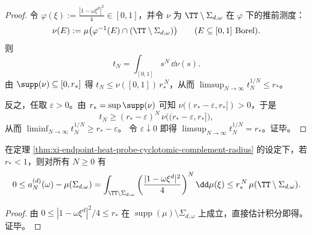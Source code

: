 \begin{proof}
令
\(
\varphi(\xi):=\frac{|1-\omega\xi^{d}|^2}{4}\in[0,1]
\)，并令 \(\nu\) 为 \(\TT\setminus\Sigma_{d,\omega}\) 在 \(\varphi\) 下的推前测度：
\[
\nu(E):=\mu\bigl(\varphi^{-1}(E)\cap(\TT\setminus\Sigma_{d,\omega})\bigr)\qquad(E\subseteq[0,1]\ \text{Borel}).
\]
则
\[
t_N=\int_{[0,1]} s^{N}\,\dd\nu(s).
\]
由 \(\supp(\nu)\subseteq[0,r_\ast]\) 得 \(t_N\le \nu([0,1])\,r_\ast^{\,N}\)，从而 \(\limsup_{N\to\infty}t_N^{1/N}\le r_\ast\)。
\par
反之，任取 \(\varepsilon>0\)。由 \(r_\ast=\sup\supp(\nu)\) 可知 \(\nu((r_\ast-\varepsilon,r_\ast])>0\)，于是
\[
t_N\ge (r_\ast-\varepsilon)^N\,\nu\bigl((r_\ast-\varepsilon,r_\ast]\bigr),
\]
从而 \(\liminf_{N\to\infty}t_N^{1/N}\ge r_\ast-\varepsilon\)。
令 \(\varepsilon\downarrow 0\) 即得 \(\limsup_{N\to\infty}t_N^{1/N}=r_\ast\)。证毕。
\end{proof}

\begin{corollary}[补支撑谱隙下的指数收敛与可审计误差界]\label{cor:xi-endpoint-heat-probe-adams-twist-spectral-gap-exp-bound}
在定理 \ref{thm:xi-endpoint-heat-probe-cyclotomic-complement-radius} 的设定下，若 \(r_\ast<1\)，则对所有 \(N\ge 0\) 有
\[
0\le a_N^{(d)}(\omega)-\mu(\Sigma_{d,\omega})
=\int_{\TT\setminus\Sigma_{d,\omega}}\left(\frac{|1-\omega\xi^{d}|^2}{4}\right)^{N}\dd\mu(\xi)
\le r_\ast^{\,N}\,\mu(\TT\setminus\Sigma_{d,\omega}).
\]
\end{corollary}
\begin{proof}
由 \(0\le |1-\omega\xi^{d}|^2/4\le r_\ast\) 在 \(\operatorname{supp}(\mu)\setminus\Sigma_{d,\omega}\) 上成立，直接估计积分即得。证毕。
\end{proof}

